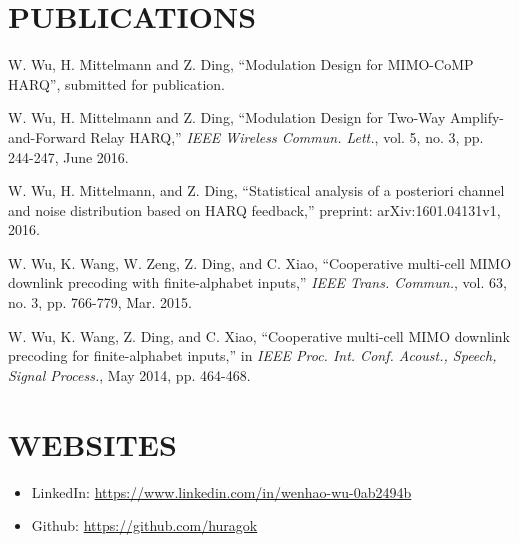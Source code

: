 \documentclass[margin]{res} %
\begin{document}
\begin{resume}
        
    
        \section{PUBLICATIONS}
        \begin{enumerate}[label={[\arabic*]}]
            \item W. Wu, H. Mittelmann and Z. Ding, ``Modulation Design for
            MIMO-CoMP HARQ'', submitted for publication.
            \item W. Wu, H. Mittelmann and Z. Ding, ``Modulation Design for
            Two-Way Amplify-and-Forward Relay HARQ,'' \emph{IEEE Wireless
            Commun. Lett.}, vol. 5, no. 3, pp. 244-247, June 2016.
            \item W. Wu, H. Mittelmann, and Z. Ding, ``Statistical analysis of a
            posteriori channel and noise distribution based on HARQ feedback,”
            preprint: arXiv:1601.04131v1, 2016.
            \item W. Wu, K. Wang, W. Zeng, Z. Ding, and C. Xiao,
            ``Cooperative multi-cell MIMO downlink precoding with
            finite-alphabet inputs,'' \emph{IEEE Trans. Commun.}, vol. 63, no.
            3, pp. 766-779, Mar. 2015.
            \item W. Wu, K. Wang, Z. Ding, and C. Xiao, ``Cooperative multi-cell
            MIMO downlink precoding for finite-alphabet inputs,'' in
            \emph{IEEE Proc. Int. Conf. Acoust., Speech, Signal Process.}, May
            2014, pp. 464-468.
        \end{enumerate}
    
    
        \section{WEBSITES} 
        \begin{itemize}
            \item LinkedIn: \url{https://www.linkedin.com/in/wenhao-wu-0ab2494b}
            \item Github: \url{https://github.com/huragok}
        \end{itemize}
        

\end{resume}
\end{document}
